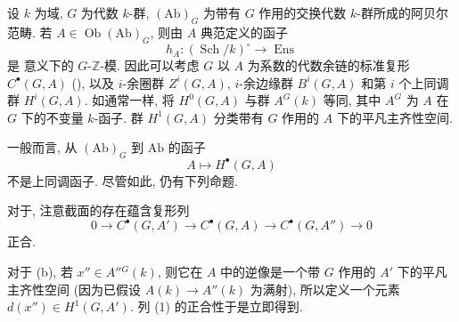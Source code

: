 设 \(k\) 为域, \(G\) 为代数 \(k\)-群,
\((\mathrm{Ab})_G\) 为带有 \(G\) 作用的交换代数 \(k\)-群所成的阿贝尔范畴.
若 \(A\in\operatorname{Ob}(\mathrm{Ab})_G\), 则由 \(A\) 典范定义的函子
\[
  h_A:(\operatorname{Sch}/k)^\circ\longrightarrow
      \operatorname{Ens}
\]
是 意义下的 \(G\)-\(\mathbb Z\)-模.
因此可以考虑 \(G\) 以 \(A\) 为系数的代数余链的标准复形 \(C^\bullet(G,A)\)
(),
以及 \(i\)-余圈群 \(Z^i(G,A)\), \(i\)-余边缘群 \(B^i(G,A)\)
和第 \(i\) 个上同调群 \(H^i(G,A)\).
如通常一样, 将 \(H^0(G,A)\) 与群 \(A^G(k)\) 等同,
其中 \(A^G\) 为 \(A\) 在 \(G\) 下的不变量 \(k\)-函子.
群 \(H^1(G,A)\) 分类带有 \(G\) 作用的 \(A\) 下的平凡主齐性空间.

一般而言, 从 \((\mathrm{Ab})_G\) 到 \(\mathrm{Ab}\) 的函子
\[
  A\longmapsto H^\bullet(G,A)
\]
不是上同调函子. 尽管如此, 仍有下列命题.


对于, 注意截面的存在蕴含复形列
\[
  0\longrightarrow C^\bullet(G,A')\longrightarrow C^\bullet(G,A)
    \longrightarrow C^\bullet(G,A'')\longrightarrow0
\]
正合.

对于 (b), 若 \(x''\in A''{}^G(k)\),
则它在 \(A\) 中的逆像是一个带 \(G\) 作用的 \(A'\) 下的平凡主齐性空间
(因为已假设 \(A(k)\to A''(k)\) 为满射),
所以定义一个元素 \(d(x'')\in H^1(G,A')\). 列 (1) 的正合性于是立即得到.

